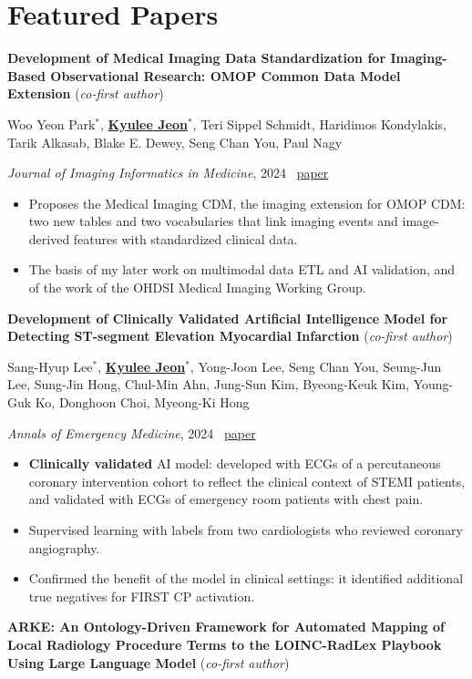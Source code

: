 \documentclass[9pt,letterpaper]{extarticle}
\newcommand{\mes}{\underline{\textbf{Kyulee Jeon}$^*$}}
\newcommand{\role}[1]{(\textit{#1})}
\begin{document}
\section{Featured Papers}
\textbf{Development of Medical Imaging Data Standardization for Imaging-Based Observational Research: OMOP Common Data Model Extension} \role{co-first author}\par
Woo Yeon Park$^*$, \mes, Teri Sippel Schmidt, Haridimos Kondylakis, Tarik Alkasab, Blake E. Dewey, Seng Chan You, Paul Nagy\par
\textit{Journal of Imaging Informatics in Medicine}, 2024 \ \href{https://doi.org/10.1007/s10278-024-00982-6}{paper}
\begin{itemize}
\item Proposes the Medical Imaging CDM, the imaging extension for OMOP CDM: two new tables and two vocabularies that link imaging events and image-derived features with standardized clinical data.
\item The basis of my later work on multimodal data ETL and AI validation, and of the work of the OHDSI Medical Imaging Working Group.
\end{itemize}
\vspace{3pt}
\textbf{Development of Clinically Validated Artificial Intelligence Model for Detecting ST-segment Elevation Myocardial Infarction} \role{co-first author}\par
Sang-Hyup Lee$^*$, \mes, Yong-Joon Lee, Seng Chan You, Seung-Jun Lee, Sung-Jin Hong, Chul-Min Ahn, Jung-Sun Kim, Byeong-Keuk Kim, Young-Guk Ko, Donghoon Choi, Myeong-Ki Hong\par
\textit{Annals of Emergency Medicine}, 2024 \ \href{https://doi.org/10.1016/j.annemergmed.2024.06.004}{paper}
\begin{itemize}
\item \textbf{Clinically validated} AI model: developed with ECGs of a percutaneous coronary intervention cohort to reflect the clinical context of STEMI patients, and validated with ECGs of emergency room patients with chest pain.
\item Supervised learning with labels from two cardiologists who reviewed coronary angiography.
\item Confirmed the benefit of the model in clinical settings: it identified additional true negatives for FIRST CP activation.
\end{itemize}
\vspace{3pt}
\textbf{ARKE: An Ontology-Driven Framework for Automated Mapping of Local Radiology Procedure Terms to the LOINC-RadLex Playbook Using Large Language Model} \role{co-first author}\par
\end{document}
